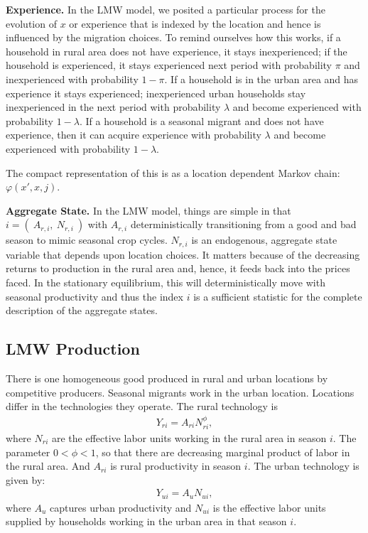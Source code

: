 \documentclass[12pt,pdftex]{article}
\begin{document}
\begin{onehalfspacing}
\textbf{Experience.} In the LMW model, we posited a particular process for the evolution of $x$ or experience that is indexed by the location and hence is influenced by the migration choices. To remind ourselves how this works, if a household in rural area does not have experience, it stays inexperienced; if the household is experienced, it stays experienced next period with probability $\pi$ and inexperienced with probability $1-\pi$.  If a household is in the urban area and has experience it stays experienced; inexperienced urban households stay inexperienced in the next period with probability $\lambda$ and become experienced with probability $1-\lambda$. If a household is a seasonal migrant and does not have experience, then it can acquire experience with probability $\lambda$ and become experienced with probability $1-\lambda$.

The compact representation of this is as a location dependent Markov chain: $\varphi(x',x, j)$.

\textbf{Aggregate State.} In the LMW model, things are simple in that $i = ( \ A_{r,i}, \ N_{r,i} \ )$ with $A_{r,i}$ deterministically transitioning from a good and bad season to mimic seasonal crop cycles. $N_{r,i}$ is an endogenous, aggregate state variable that depends upon location choices. It matters because of the decreasing returns to production in the rural area and, hence, it feeds back into the prices faced. In the stationary equilibrium, this will deterministically move with seasonal productivity and thus the index $i$ is a sufficient statistic for the complete description of the aggregate states.

\subsection{LMW Production}

There is one homogeneous good produced in rural and urban locations by competitive producers. Seasonal migrants work in the urban location. Locations differ in the technologies they operate. The rural technology is
\begin{align}
Y_{ri} = A_{ri} N_{ri}^\phi,
\end{align}
where $N_{ri}$ are the effective labor units working in the rural area in season $i$. The parameter $0<\phi <1$, so that there are decreasing marginal product of labor in the rural area. And $A_{ri}$ is rural productivity in season $i$. The urban technology is given by:
\begin{align}
Y_{ui} = A_u N_{ui},
\end{align}
where $A_u$ captures urban productivity and $N_{ui}$ is the effective labor units supplied by households working in the urban area in that season $i$.


\end{onehalfspacing}
\end{document}
